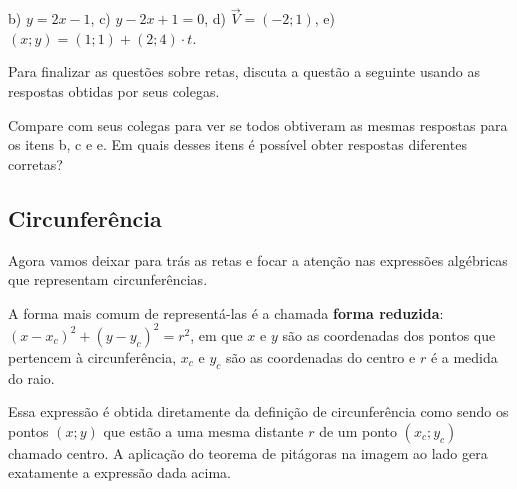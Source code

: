 \documentclass[main.tex]{subfiles}
\begin{document}
\begin{gabarito}
	\begin{gabaritoQuestao}
		b) $y=2x-1$, c) $y-2x+1=0$, d) $\overrightarrow{V}=(-2;1)$, e) $(x;y)=(1;1)+(2;4) \cdot t$.
	\end{gabaritoQuestao}
\end{gabarito}

Para finalizar as questões sobre retas, discuta a questão a seguinte usando as respostas obtidas por seus colegas.

\begin{reflita}
Compare com seus colegas para ver se todos obtiveram as mesmas respostas para os itens b, c e e. Em quais desses itens é possível obter respostas diferentes corretas? 
\end{reflita}


\subsection*{Circunferência}

Agora vamos deixar para trás as retas e focar a atenção nas expressões algébricas que representam circunferências.


A forma mais comum de representá-las é a chamada \textbf{forma reduzida}: $(x-x_c)^2+(y-y_c)^2=r^2$, em que $x$ e $y$ são as coordenadas dos pontos que pertencem à circunferência, $x_c$ e $y_c$ são as coordenadas do centro e $r$ é a medida do raio.

Essa expressão é obtida diretamente da definição de circunferência como sendo os pontos $(x;y)$ que estão a uma mesma distante $r$ de um ponto $(x_c;y_c)$ chamado centro. A aplicação do teorema de pitágoras na imagem ao lado gera exatamente a expressão dada acima.
\end{document}
